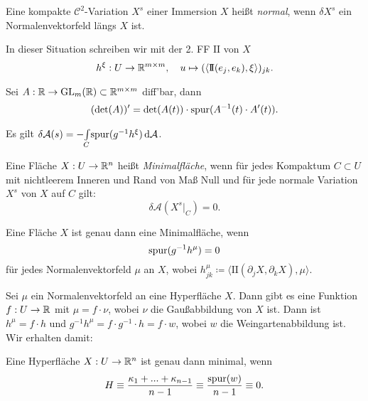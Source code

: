 \documentclass{cheat-sheet}
\newcommand{\II}{\mathrm{I\!I}}
\newcommand{\A}{\mathcal{A}}
\begin{document}
\begin{defn}
  Eine kompakte $\mathcal{C}^2$-Variation $X^s$ einer Immersion $X$ heißt \emph{normal}, wenn $\delta X^s$ ein Normalenvektorfeld längs $X$ ist.
\end{defn}

\begin{defn}
  In dieser Situation schreiben wir mit der 2. FF $\II$ von $X$
  \[ h^\xi : U \to \R^{m \times m}, \quad u \mapsto (\langle \II(e_j, e_k), \xi \rangle)_{jk}. \]
\end{defn}

\begin{lem}
  Sei $A : \mathbb{R} \to \mathrm{GL}_m(\mathbb{R}) \subset \mathbb{R}^{m \times m}$ diff'bar, dann
  \[ (\det(A))' = \det(A(t)) \cdot \mathrm{spur}(A^{-1}(t) \cdot A'(t)). \]
\end{lem}

\begin{satz}
  Es gilt $\delta \A(s) = - \Int{C}{}{\spur(g^{-1} h^\xi)}{\A}$.
\end{satz}

\begin{defn}
  Eine Fläche $X : U \to \mathbb{R}^n$ heißt \emph{Minimalfläche}, wenn für jedes Kompaktum $C \subset U$ mit nichtleerem Inneren und Rand von Maß Null und für jede normale Variation $X^s$ von $X$ auf $C$ gilt:
  \[ \delta \A(X^s|_C) = 0. \]
\end{defn}

\begin{satz}
  Eine Fläche $X$ ist genau dann eine Minimalfläche, wenn
  \[ \mathrm{spur}(g^{-1} h^{\mu}) = 0 \]
  für jedes Normalenvektorfeld $\mu$ an $X$, wobei $h^\mu_{jk} \coloneqq \langle \II(\partial_j X, \partial_k X), \mu \rangle$.
\end{satz}

\begin{bem}
  Sei $\mu$ ein Normalenvektorfeld an eine Hyperfläche $X$. Dann gibt es eine Funktion $f : U \to \mathbb{R}$ mit $\mu = f \cdot \nu$, wobei $\nu$ die Gaußabbildung von $X$ ist. Dann ist $h^\mu = f \cdot h$ und $g^{-1} h^{\mu} = f \cdot g^{-1} \cdot h = f \cdot w$, wobei $w$ die Weingartenabbildung ist. Wir erhalten damit:
\end{bem}

\begin{satz}
  Eine Hyperfläche $X : U \to \mathbb{R}^n$ ist genau dann minimal, wenn
  \[ H \equiv \frac{\kappa_1 + ... + \kappa_{n{-}1}}{n-1} \equiv \frac{\mathrm{spur}(w)}{n-1} \equiv 0. \]
\end{satz}
\end{document}
